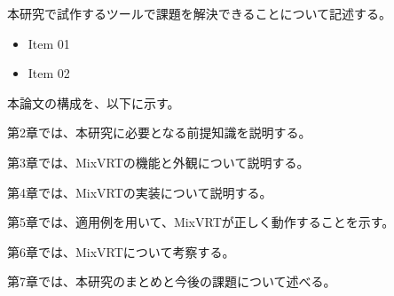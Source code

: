 本研究で試作するツールで課題を解決できることについて記述する。
\begin{itemize}
    \item Item 01
    \item Item 02
\end{itemize}

\par
本論文の構成を、以下に示す。\par
第2章では、本研究に必要となる前提知識を説明する。\par
第3章では、MixVRTの機能と外観について説明する。\par
第4章では、MixVRTの実装について説明する。\par
第5章では、適用例を用いて、MixVRTが正しく動作することを示す。\par
第6章では、MixVRTについて考察する。\par
第7章では、本研究のまとめと今後の課題について述べる。
